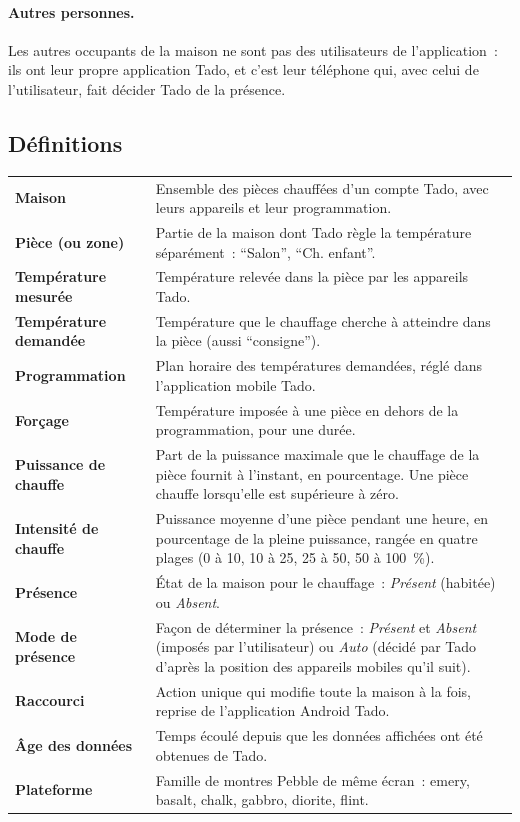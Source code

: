 \paragraph{Autres personnes.} Les autres occupants de la maison ne sont pas des utilisateurs
de l'application~: ils ont leur propre application Tado, et c'est leur téléphone qui, avec
celui de l'utilisateur, fait décider Tado de la présence.

\subsection{Définitions}

\begin{longtable}{@{}>{\bfseries}p{42mm}p{118mm}@{}}
  Maison & Ensemble des pièces chauffées d'un compte Tado, avec leurs appareils et leur programmation. \\
  Pièce (ou zone) & Partie de la maison dont Tado règle la température séparément~: \enquote{Salon}, \enquote{Ch. enfant}. \\
  Température mesurée & Température relevée dans la pièce par les appareils Tado. \\
  Température demandée & Température que le chauffage cherche à atteindre dans la pièce (aussi \enquote{consigne}). \\
  Programmation & Plan horaire des températures demandées, réglé dans l'application mobile Tado. \\
  Forçage & Température imposée à une pièce en dehors de la programmation, pour une durée. \\
  Puissance de chauffe & Part de la puissance maximale que le chauffage de la pièce fournit à l'instant, en pourcentage. Une pièce chauffe lorsqu'elle est supérieure à zéro. \\
  Intensité de chauffe & Puissance moyenne d'une pièce pendant une heure, en pourcentage de la pleine puissance, rangée en quatre plages (0 à 10, 10 à 25, 25 à 50, 50 à 100~\%). \\
  Présence & État de la maison pour le chauffage~: \emph{Présent} (habitée) ou \emph{Absent}. \\
  Mode de présence & Façon de déterminer la présence~: \emph{Présent} et \emph{Absent} (imposés par l'utilisateur) ou \emph{Auto} (décidé par Tado d'après la position des appareils mobiles qu'il suit). \\
  Raccourci & Action unique qui modifie toute la maison à la fois, reprise de l'application Android Tado. \\
  Âge des données & Temps écoulé depuis que les données affichées ont été obtenues de Tado. \\
  Plateforme & Famille de montres Pebble de même écran~: emery, basalt, chalk, gabbro, diorite, flint. \\
\end{longtable}

